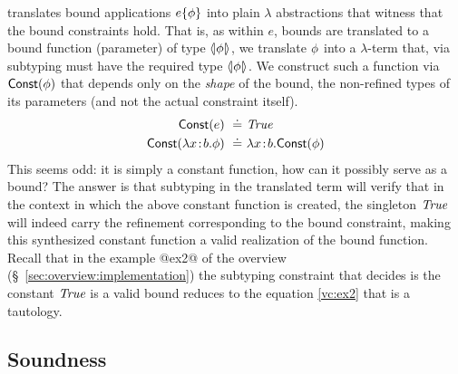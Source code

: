  translates bound applications
$ e \{ \phi \} $ into plain $\lambda$
abstractions that witness that the bound constraints
hold.
%
That is, as within $e$, bounds are translated to a bound
function (parameter) of type $\langle\!| \phi |\!\rangle$, we
translate $\phi$ into a $\lambda$-term that, via
subtyping must have the required type $\langle\!| \phi |\!\rangle$.
%
We construct such a function via $\mathsf{Const}(\phi)$
that depends only on the \emph{shape} of the bound,
\ie the non-refined types of its parameters (and not
the actual constraint itself).
\begin{align*}
\mathsf{Const}(e) \ \doteq\  & \textit{True} \\
\mathsf{Const}(\lambda {x\!:\!b}. \phi) \ \doteq\  &  \lambda {x\!:\!b}. \mathsf{Const}(\phi)
\end{align*}
%
This seems odd: it is simply a constant function, how
can it possibly serve as a bound? The answer is that
subtyping in the translated \corelan term will verify
that in the context in which the above constant function
is created, the singleton $\textit{True}$ will indeed carry
the refinement corresponding to the bound constraint,
making this synthesized constant function a valid
realization of the bound function.
%
Recall that in the example @ex2@ of the overview (\S~\ref{sec:overview:implementation})
the subtyping constraint that decides is the constant $\textit{True}$
is a valid bound reduces to the equation \ref{vc:ex2}
that is a tautology.

\subsection{Soundness}\label{sec:soundness}

